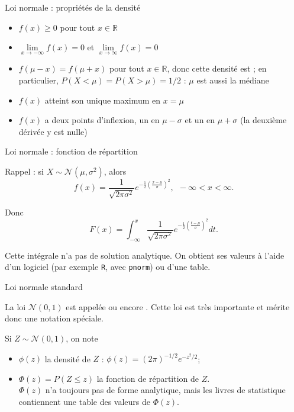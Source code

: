\documentclass{BeamerTemplate}
\begin{document}
\begin{frame}[t]{Loi normale : propriétés de la densité}

\vspace{0.2in}
\begin{itemize}\itemsep10pt
\item $f(x)\ge0$ pour tout $x\in\mathbb{R}$
\item $\lim\limits_{x\to -\infty}f(x)=0$ et $\lim\limits_{x\to\infty}f(x)=0$
\item $f(\mu-x)=f(\mu+x)$ pour tout $x\in\mathbb{R}$, donc cette densité
est ; en particulier, $P(X<\mu)=P(X>\mu)=1/2$ :
$\mu$ est aussi la médiane
\item $f(x)$ atteint son unique maximum en $x=\mu$
\item $f(x)$ a deux points d'inflexion, un en $\mu-\sigma$ et un en $\mu+\sigma$ (la deuxième dérivée y est nulle)
\end{itemize}
\end{frame}


\begin{frame}[t]{Loi normale : fonction de répartition}

\vspace{0.2in}
Rappel : si $X\sim \mathcal{N}(\mu,\sigma^2)$, alors
$$f(x)=\frac{1}{\sqrt{2\pi\sigma^2}}
e^{-\frac{1}{2}\left(\frac{x-\mu}{\sigma}\right)^2},\ \
-\infty<x<\infty.$$

Donc
$$ F(x) = \int_{-\infty}^x \frac{1}{\sqrt{2\pi\sigma^2}}
e^{-\frac{1}{2}\left(\frac{t-\mu}{\sigma}\right)^2} dt.$$

\vspace{0.2in}
Cette intégrale n'a pas de solution analytique. On obtient ses valeurs à l'aide d'un logiciel
(par exemple \texttt{R}, avec \texttt{pnorm}) ou d'une table.

\end{frame}


\begin{frame}[t]{Loi normale standard}

La loi $\mathcal{N}(0,1)$ est appelée  ou encore .
Cette loi est très importante et mérite donc une notation spéciale.

\vspace{0.1in}
Si $Z \sim \mathcal{N}(0,1)$, on note
\begin{itemize}\itemsep8pt
\item  $\phi(z)$ la densité de $Z$ :
$\phi(z)=(2\pi)^{-1/2}e^{-z^2/2}$;
\item $\Phi(z)=P(Z\le z)$ la fonction de répartition de $Z$. \\[4pt]
$\Phi(z)$ n'a toujours pas de forme analytique, mais les livres de statistique contiennent une table des valeurs de $\Phi(z)$.
\end{itemize}

\end{frame}
\end{document}
